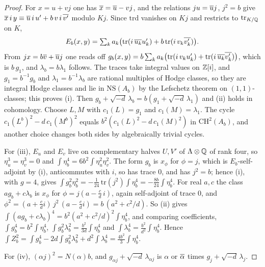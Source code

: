 \begin{proof}
For $x=u+vj$ one has $\overline{x}=\overline{u}-vj$, and the relations $ju=\overline{u}j$,
$j^{2}=b$ give
$\overline{x}\,i\,y\equiv\overline{u}\,i\,u'+b\,v\,i\,\overline{v'}$ modulo $Kj$. Since
$\mathrm{trd}$ vanishes on $Kj$ and restricts to $\mathrm{tr}_{K/\mathbb{Q}}$ on $K$,
\[
  E_{b}(x,y)=\textstyle\sum_{k}a_{k}\bigl(\mathrm{tr}(i\,\overline{u_{k}}u'_{k})
  +b\,\mathrm{tr}(i\,v_{k}\overline{v'_{k}})\bigr).
\]
From $jx=b\overline{v}+\overline{u}j$ one reads off
$g_{b}(x,y)=b\sum_{k}a_{k}\bigl(\mathrm{tr}(i\,v_{k}u'_{k})
+\mathrm{tr}(i\,\overline{u_{k}}\overline{v'_{k}})\bigr)$, which is $b\,g_{1}$, and
$\lambda_{b}=b\lambda_{1}$ follows. The traces take integral values on
$\mathbb{Z}[i]$, and $g_{1}=b^{-1}g_{b}$ and $\lambda_{1}=b^{-1}\lambda_{b}$ are
rational multiples of Hodge classes, so they are integral Hodge classes and
lie in $\mathrm{NS}(A_{b})$ by the Lefschetz theorem on $(1,1)$-classes; this
proves (i). Then
$g_{b}+\sqrt{-d}\,\lambda_{b}=b(g_{1}+\sqrt{-d}\,\lambda_{1})$ and (ii) holds
in cohomology. Choose $L,M$ with $c_{1}(L)=g_{1}$ and
$c_{1}(M)=\lambda_{1}$. The cycle $c_{1}(L^{b})^{2}-d\,c_{1}(M^{b})^{2}$ equals
$b^{2}(c_{1}(L)^{2}-d\,c_{1}(M)^{2})$ in $\mathrm{CH}^{2}(A_{b})$, and another
choice changes both sides by algebraically trivial cycles.

For (iii), $E_{u}$ and $E_{v}$ live on complementary halves $U,V'$ of
$\Lambda\otimes\mathbb{Q}$ of rank four, so $\eta_{u}^{3}=\eta_{v}^{3}=0$ and
$\int\eta_{b}^{4}=6b^{2}\int\eta_{u}^{2}\eta_{v}^{2}$. The form $g_{b}$ is
$x_{\phi}$ for $\phi=j$, which is $E_{b}$-self-adjoint by
(i), anticommutes with $i$, so has trace $0$, and has
$j^{2}=b$; hence (i), with $g=4$, gives
$\int g_{b}^{2}\eta_{b}^{2}=-\tfrac{1}{24}\,\mathrm{tr}(j^{2})\int\eta_{b}^{4}
=-\tfrac{8b}{24}\int\eta_{b}^{4}$. For real $a,c$ the class
$ag_{b}+c\lambda_{b}$ is $x_{\phi}$ for $\phi=j(a-\tfrac{c}{d}\,i)$, again
self-adjoint of trace $0$, and
$\phi^{2}=(a+\tfrac{c}{d}i)\,j^{2}\,(a-\tfrac{c}{d}i)=b\,(a^{2}+c^{2}/d)$.
So (ii) gives
$\int(ag_{b}+c\lambda_{b})^{4}=b^{2}(a^{2}+c^{2}/d)^{2}\int\eta_{b}^{4}$, and
comparing coefficients, $\int g_{b}^{4}=b^{2}\int\eta_{b}^{4}$,
$\int g_{b}^{2}\lambda_{b}^{2}=\tfrac{b^{2}}{3d}\int\eta_{b}^{4}$ and
$\int\lambda_{b}^{4}=\tfrac{b^{2}}{d^{2}}\int\eta_{b}^{4}$. Hence
$\int Z_{b}^{2}=\int g_{b}^{4}-2d\int g_{b}^{2}\lambda_{b}^{2}
+d^{2}\int\lambda_{b}^{4}=\tfrac{4b^{2}}{3}\int\eta_{b}^{4}$.

For (iv), $(\alpha j)^{2}=N(\alpha)b$, and
$g_{\alpha j}+\sqrt{-d}\,\lambda_{\alpha j}$ is $\alpha$ or $\overline{\alpha}$
times $g_{j}+\sqrt{-d}\,\lambda_{j}$.
\end{proof}

